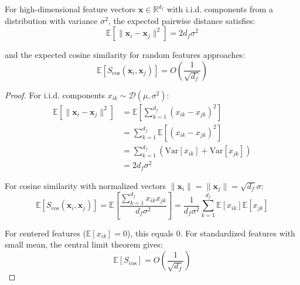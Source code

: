 \begin{lemma}
\label{lem:feature_scaling}
For high-dimensional feature vectors $\mathbf{x} \in \mathbb{R}^{d_f}$ with i.i.d. components from a distribution with variance $\sigma^2$, the expected pairwise distance satisfies:
\begin{equation}
\mathbb{E}\left[\|\mathbf{x}_i - \mathbf{x}_j\|^2\right] = 2d_f \sigma^2
\end{equation}

and the expected cosine similarity for random features approaches:
\begin{equation}
\mathbb{E}[S_{\cos}(\mathbf{x}_i, \mathbf{x}_j)] = O\left(\frac{1}{\sqrt{d_f}}\right)
\end{equation}
\end{lemma}

\begin{proof}
For i.i.d. components $x_{ik} \sim \mathcal{D}(\mu, \sigma^2)$:
\begin{align}
\mathbb{E}\left[\|\mathbf{x}_i - \mathbf{x}_j\|^2\right] &= \mathbb{E}\left[\sum_{k=1}^{d_f} (x_{ik} - x_{jk})^2\right] \\
&= \sum_{k=1}^{d_f} \mathbb{E}[(x_{ik} - x_{jk})^2] \\
&= \sum_{k=1}^{d_f} (\text{Var}[x_{ik}] + \text{Var}[x_{jk}]) \\
&= 2d_f\sigma^2
\end{align}

For cosine similarity with normalized vectors $\|\mathbf{x}_i\| = \|\mathbf{x}_j\| = \sqrt{d_f}\sigma$:
\begin{equation}
\mathbb{E}[S_{\cos}(\mathbf{x}_i, \mathbf{x}_j)] = \mathbb{E}\left[\frac{\sum_{k=1}^{d_f} x_{ik}x_{jk}}{d_f\sigma^2}\right] = \frac{1}{d_f\sigma^2}\sum_{k=1}^{d_f}\mathbb{E}[x_{ik}]\mathbb{E}[x_{jk}]
\end{equation}

For centered features ($\mathbb{E}[x_{ik}] = 0$), this equals 0. For standardized features with small mean, the central limit theorem gives:
\begin{equation}
\mathbb{E}[S_{\cos}] = O\left(\frac{1}{\sqrt{d_f}}\right)
\end{equation}
\end{proof}

